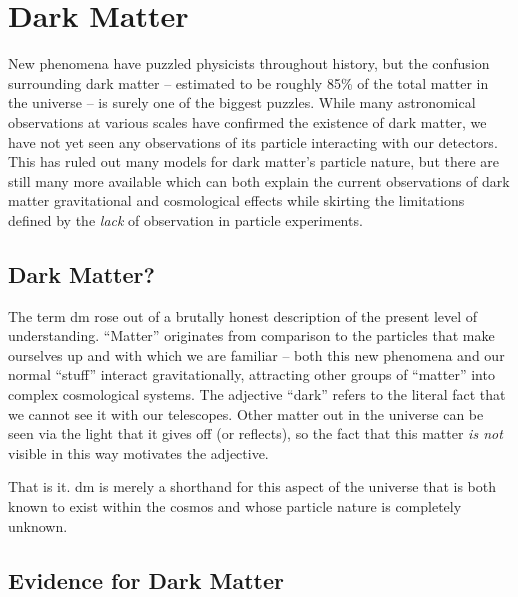 \chapter{Dark Matter}
\label{chapter:dm}

New phenomena have puzzled physicists throughout history, but the confusion
surrounding dark matter -- estimated to be roughly 85\% of the total matter in the universe -- is
surely one of the biggest puzzles. While many astronomical observations at various scales have
confirmed the existence of dark matter, we have not yet seen any observations of its particle
interacting with our detectors. This has ruled out many models for dark matter's particle nature,
but there are still many more available which can both explain the current observations of dark
matter gravitational and cosmological effects while skirting the limitations defined by the
\emph{lack} of observation in particle experiments.

\section{Dark Matter?}
The term \ac{dm} rose out of a brutally honest description of the present level of understanding.
``Matter'' originates from comparison to the particles that make ourselves up and
with which we are familiar -- both this new phenomena and our normal ``stuff'' interact gravitationally,
attracting other groups of ``matter'' into complex cosmological systems.
The adjective ``dark'' refers to the literal fact that we cannot
see it with our telescopes. Other matter out in the universe can be seen via the light
that it gives off (or reflects), so the fact that
this matter \emph{is not} visible in this way motivates the adjective.

That is it. \acf{dm} is merely a shorthand for this aspect of the universe that is both
known to exist within the cosmos and whose particle nature is completely unknown.

\section{Evidence for Dark Matter}
\label{sec:dm:evidence}

